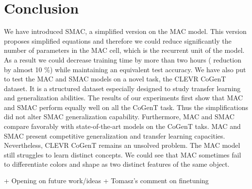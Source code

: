 \section{Conclusion}
We have introduced SMAC, a simplified version on the MAC model. This version proposes simplified equations and therefore we could reduce significantly the number of parameters in the MAC cell, which is the recurrent unit of the model. As a result we could decrease training time by more than two hours ( reduction by almost 10 \%)
while maintaining an equivalent test accuracy. 
We have also put to test the MAC and SMAC models on a novel task, the CLEVR CoGenT dataset.
It is a structured dataset especially designed to study transfer learning and generalization abilities. The results of our experiments first show that MAC and SMAC perform equally well on all the CoGenT task. Thus the simplifications did not alter SMAC generalization capability.
Furthermore, MAC and SMAC compare favorably with state-of-the-art models on the CoGenT taks. MAC and SMAC present competitive generalization and transfer learning capacities.
Nevertheless, CLEVR CoGenT remains an unsolved problem. The MAC model still struggles to learn distinct concepts. We could see that MAC sometimes fail to differentiate colors and shape as two distinct features of the same object. 

+ Opening on future work/ideas
+ Tomasz’s comment on finetuning

